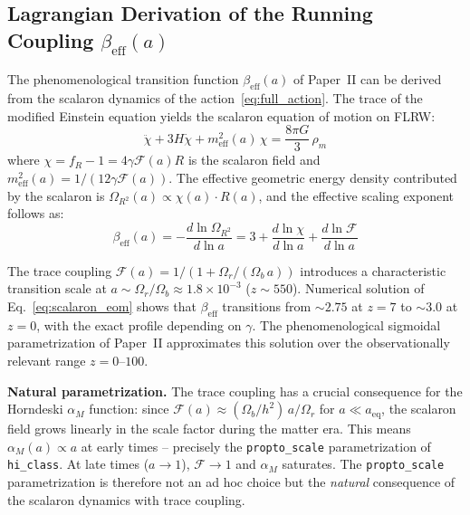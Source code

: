 \documentclass[aps,prd,twocolumn,superscriptaddress,nofootinbib]{revtex4-2}
\begin{document}
\subsection{Lagrangian Derivation of the Running Coupling $\beta_{\mathrm{eff}}(a)$}
\label{subsec:beta_derivation}

The phenomenological transition function $\beta_{\mathrm{eff}}(a)$ of Paper~II can be derived from the scalaron dynamics of the action~\eqref{eq:full_action}. The trace of the modified Einstein equation yields the scalaron equation of motion on FLRW:
\begin{equation}
\ddot{\chi} + 3H\dot{\chi} + m_{\mathrm{eff}}^2(a)\,\chi = \frac{8\pi G}{3}\,\rho_m
\label{eq:scalaron_eom}
\end{equation}
where $\chi = f_R - 1 = 4\gamma\mathcal{F}(a) R$ is the scalaron field and $m_{\mathrm{eff}}^2(a) = 1/(12\gamma\mathcal{F}(a))$. The effective geometric energy density contributed by the scalaron is $\Omega_{R^2}(a) \propto \chi(a) \cdot R(a)$, and the effective scaling exponent follows as:
\begin{equation}
{\beta_{\mathrm{eff}}(a) = -\frac{d\ln\Omega_{R^2}}{d\ln a} = 3 + \frac{d\ln\chi}{d\ln a} + \frac{d\ln\mathcal{F}}{d\ln a}}
\label{eq:beta_from_lagrangian}
\end{equation}

The trace coupling $\mathcal{F}(a) = 1/(1 + \Omega_r/(\Omega_b\,a))$ introduces a characteristic transition scale at $a \sim \Omega_r/\Omega_b \approx 1.8 \times 10^{-3}$ ($z \sim 550$). Numerical solution of Eq.~\eqref{eq:scalaron_eom} shows that $\beta_{\mathrm{eff}}$ transitions from $\sim 2.75$ at $z = 7$ to $\sim 3.0$ at $z = 0$, with the exact profile depending on $\gamma$. The phenomenological sigmoidal parametrization of Paper~II approximates this solution over the observationally relevant range $z = 0$--$100$.

\textbf{Natural parametrization.} The trace coupling has a crucial consequence for the Horndeski $\alpha_M$ function: since $\mathcal{F}(a) \approx (\Omega_b/h^2)\,a/\Omega_r$ for $a \ll a_{\mathrm{eq}}$, the scalaron field grows linearly in the scale factor during the matter era. This means $\alpha_M(a) \propto a$ at early times -- precisely the \texttt{propto\_scale} parametrization of \texttt{hi\_class}. At late times ($a \to 1$), $\mathcal{F} \to 1$ and $\alpha_M$ saturates. The \texttt{propto\_scale} parametrization is therefore not an ad hoc choice but the \textit{natural} consequence of the scalaron dynamics with trace coupling.
\end{document}

